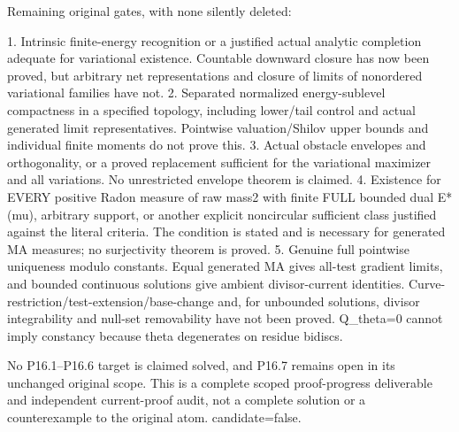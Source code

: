 \documentclass[11pt]{article}
\begin{document}
Remaining original gates, with none silently deleted:

1. Intrinsic finite-energy recognition or a justified actual analytic completion adequate for variational existence. Countable downward closure has now been proved, but arbitrary net representations and closure of limits of nonordered variational families have not.
2. Separated normalized energy-sublevel compactness in a specified topology, including lower/tail control and actual generated limit representatives. Pointwise valuation/Shilov upper bounds and individual finite moments do not prove this.
3. Actual obstacle envelopes and orthogonality, or a proved replacement sufficient for the variational maximizer and all variations. No unrestricted envelope theorem is claimed.
4. Existence for EVERY positive Radon measure of raw mass2 with finite FULL bounded dual E*(mu), arbitrary support, or another explicit noncircular sufficient class justified against the literal criteria. The condition is stated and is necessary for generated MA measures; no surjectivity theorem is proved.
5. Genuine full pointwise uniqueness modulo constants. Equal generated MA gives all-test gradient limits, and bounded continuous solutions give ambient divisor-current identities. Curve-restriction/test-extension/base-change and, for unbounded solutions, divisor integrability and null-set removability have not been proved. Q\_theta=0 cannot imply constancy because theta degenerates on residue bidiscs.

No P16.1--P16.6 target is claimed solved, and P16.7 remains open in its unchanged original scope. This is a complete scoped proof-progress deliverable and independent current-proof audit, not a complete solution or a counterexample to the original atom. candidate=false.
\end{document}
